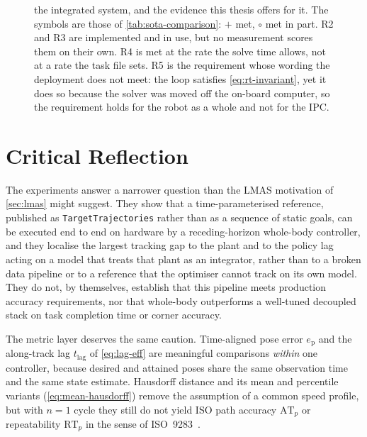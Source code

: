 \begin{figure}[htbp]
{    the integrated system, and the evidence this thesis offers for it. The
    symbols are those of \cref{tab:sota-comparison}: $+$ met, $\circ$ met
    in part. R2 and R3 are implemented and in use, but no measurement
    scores them on their own. R4 is met at the rate the solve time allows,
    not at a rate the task file sets. R5
    is the requirement whose wording the deployment does not meet: the loop
    satisfies \cref{eq:rt-invariant}, yet it does so because the solver was
    moved off the on-board computer, so the requirement holds for the robot
    as a whole and not for the IPC.}
  \label{fig:requirements-trace}
\end{figure}

\section{Critical Reflection}
\label{sec:concl-reflection}

\begin{sloppypar}
The experiments answer a narrower question than the LMAS motivation of
\cref{sec:lmas} might suggest. They show that a time-parameterised
\ee{} reference, published as \ocs{} \texttt{TargetTrajectories} rather
than as a sequence of static goals, can be executed end to end on
\hero{} hardware by a receding-horizon whole-body controller, and they
localise the largest tracking gap to the plant and to the policy lag
acting on a model that treats that plant as an integrator, rather than
to a broken data pipeline or to a reference that the optimiser cannot
track on its own model. They do not, by themselves, establish that this
pipeline meets production accuracy requirements, nor that whole-body
\mpc{} outperforms a well-tuned decoupled stack on task completion time
or corner accuracy.
\end{sloppypar}

The metric layer deserves the same caution. Time-aligned pose error
$e_{\mathrm{p}}$ and the along-track lag $t_{\mathrm{lag}}$ of
\cref{eq:lag-eff} are meaningful comparisons \emph{within} one
controller, because desired and attained poses share the same
observation time and the same state estimate. Hausdorff distance and its
mean and percentile variants (\cref{eq:mean-hausdorff}) remove the
assumption of a common speed profile, but with $n=1$ cycle they still
do not yield ISO path accuracy $\mathrm{AT}_{p}$ or repeatability
$\mathrm{RT}_{p}$ in the sense of ISO~9283~\cite{ISO9283}.

